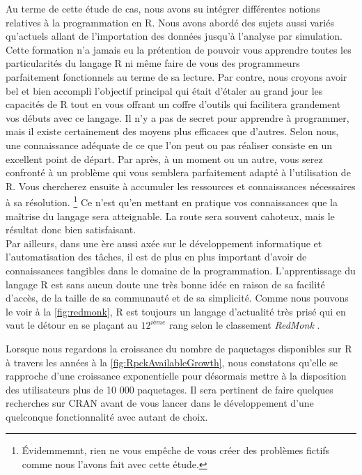 Au terme de cette étude de cas, nous avons su intégrer différentes notions relatives à la programmation en R. Nous avons abordé des sujets aussi variés qu'actuels allant de l'importation des données jusqu'à l'analyse par simulation. \\

Cette formation n'a jamais eu la prétention de pouvoir vous apprendre toutes les particularités du langage R ni même faire de vous des programmeurs parfaitement fonctionnels au terme de sa lecture. Par contre, nous croyons avoir bel et bien accompli l'objectif principal qui était d'étaler au grand jour les capacités de R tout en vous offrant un coffre d'outils qui facilitera grandement vos débuts avec ce langage. Il n'y a pas de secret pour apprendre à programmer, mais il existe certainement des moyens plus efficaces que d'autres. Selon nous, une connaissance adéquate de ce que l'on peut ou pas réaliser consiste en un excellent point de départ. Par après, à un moment ou un autre, vous serez confronté à un problème qui vous semblera parfaitement adapté à l'utilisation de R. Vous chercherez ensuite à accumuler les ressources et connaissances nécessaires à sa résolution. \footnote{Évidemmemnt, rien ne vous empêche de vous créer des problèmes fictifs comme nous l'avons fait avec cette étude.} Ce n'est qu'en mettant en pratique vos connaissances que la maîtrise du langage sera atteignable. La route sera souvent cahoteux, mais le résultat donc bien satisfaisant. \\

Par ailleurs, dans une ère aussi axée sur le développement informatique et l'automatisation des tâches, il est de plus en plus important d'avoir de connaissances tangibles dans le domaine de la programmation. L'apprentissage du langage R est sans aucun doute une très bonne idée en raison de sa facilité d'accès, de la taille de sa communauté et de sa simplicité. Comme nous pouvons le voir à la \autoref{fig:redmonk}, R est toujours un langage d'actualité très prisé qui en vaut le détour en se plaçant au $12^{ième}$ rang selon le classement \emph{RedMonk} \cite{codingGame}. \\


Lorsque nous regardons la croissance du nombre de paquetages disponibles sur R à travers les années à la \autoref{fig:RpckAvailableGrowth}, nous constatons qu'elle se rapproche d'une croissance exponentielle pour désormais mettre à la disposition des utilisateurs plus de 10 000 paquetages. Il sera pertinent de faire quelques recherches sur CRAN avant de vous lancer dans le développement d'une quelconque fonctionnalité avec autant de choix. \\


